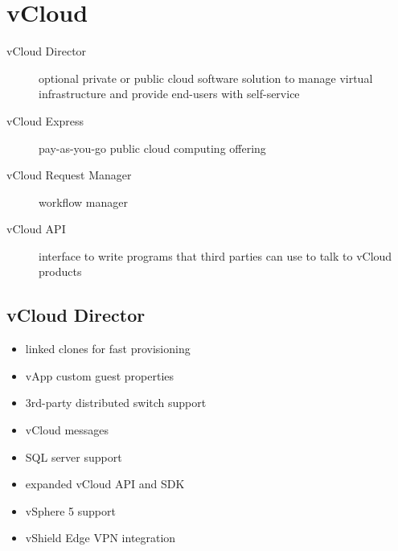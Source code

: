 \section{vCloud}

\begin{description}

\item[vCloud Director]
optional private or public cloud software solution to manage virtual
infrastructure and provide end-users with self-service

\item[vCloud Express]
pay-as-you-go public cloud computing offering

\item[vCloud Request Manager]
workflow manager

\item[vCloud API]
interface to write programs that third parties can use to talk to vCloud
products

\end{description}

\subsection{vCloud Director}

\begin{itemize}

\item linked clones for fast provisioning
\item vApp custom guest properties
\item 3rd-party distributed switch support
\item vCloud messages
\item SQL server support
\item expanded vCloud API and SDK
\item vSphere 5 support
\item vShield Edge VPN integration

\end{itemize}
